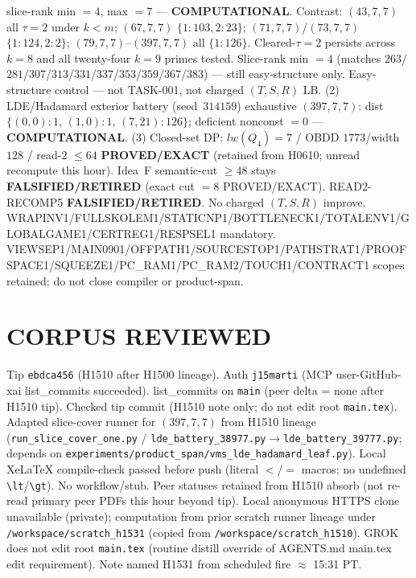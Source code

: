 \documentclass[11pt]{article}
\begin{document}
slice-rank min $=4$, max $=7$ --- \textbf{COMPUTATIONAL}.
Contrast: $(43,7,7)$ all $\tau{=}2$ under $k{<}m$; $(67,7,7)$ $\{1{:}103,2{:}23\}$;
$(71,7,7)$/$(73,7,7)$ $\{1{:}124,2{:}2\}$; $(79,7,7)$--$(397,7,7)$ all $\{1{:}126\}$.
Cleared-$\tau{=}2$ persists across $k{=}8$ and all twenty-four $k{=}9$ primes tested.
Slice-rank min $=4$ (matches $263$/$281$/$307$/$313$/$331$/$337$/$353$/$359$/$367$/$383$) --- still easy-structure only.
Easy-structure control --- not TASK-001, not charged $(T,S,R)$ LB.
(2) LDE/Hadamard exterior battery (seed~$314159$) exhaustive $(397,7,7)$:
dist $\{(0,0){:}1,\,(1,0){:}1,\,(7,21){:}126\}$; deficient nonconst $=0$ --- \textbf{COMPUTATIONAL}.
(3) Closed-set DP: $lw(Q_4)=7$ / OBDD $1773$/width $128$ / read-$2$ $\le64$
\textbf{PROVED/EXACT} (retained from H0610; unread recompute this hour).
Idea~F semantic-cut $\ge48$ stays \textbf{FALSIFIED/RETIRED} (exact cut $=8$ PROVED/EXACT).
READ2-RECOMP5 \textbf{FALSIFIED/RETIRED}. No charged $(T,S,R)$ improve.
WRAPINV1/FULLSKOLEM1/STATICNP1/BOTTLENECK1/TOTALENV1/GLOBALGAME1/CERTREG1/RESPSEL1 mandatory.
VIEWSEP1/MAIN0901/OFFPATH1/SOURCESTOP1/PATHSTRAT1/PROOFSPACE1/SQUEEZE1/PC\_RAM1/PC\_RAM2/TOUCH1/CONTRACT1 scopes retained; do not close compiler or product-span.

\section*{CORPUS REVIEWED}
Tip \texttt{ebdca456} (H1510 after H1500 lineage). Auth \texttt{j15marti} (MCP user-GitHub-xai list\_commits succeeded).
list\_commits on \texttt{main} (peer delta = none after H1510 tip).
Checked tip commit (H1510 note only; do not edit root \texttt{main.tex}).
Adapted slice-cover runner for $(397,7,7)$ from H1510 lineage
(\texttt{run\_slice\_cover\_one.py} / \texttt{lde\_battery\_38977.py}$\to$\texttt{lde\_battery\_39777.py};
depends on \texttt{experiments/product\_span/vms\_lde\_hadamard\_leaf.py}).
Local XeLaTeX compile-check passed before push (literal $<$/$=$ macros; no undefined \texttt{\textbackslash lt}/\texttt{\textbackslash gt}).
No workflow/stub. Peer statuses retained from H1510 absorb (not re-read primary peer PDFs this hour beyond tip).
Local anonymous HTTPS clone unavailable (private);
computation from prior scratch runner lineage under \texttt{/workspace/scratch\_h1531}
(copied from \texttt{/workspace/scratch\_h1510}).
GROK does not edit root \texttt{main.tex} (routine distill override of AGENTS.md main.tex edit requirement).
Note named H1531 from scheduled fire $\approx$ 15:31 PT.
\end{document}
